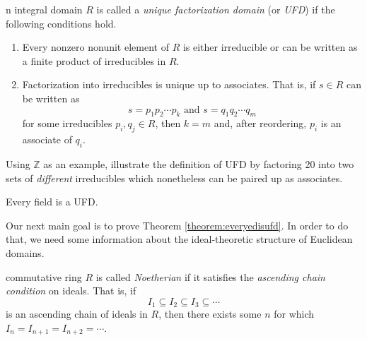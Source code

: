 \documentclass[english,course]{lecture}
\theoremstyle{plain}
\newenvironment{definition}[1]
  {\renewcommand\theinnerdefinition{#1}\innerdefinition}
  {\endinnerdefinition}
\def\Z{{\mathbb Z}}
\def\presnotes{}
\begin{document}
\begin{definition}
	An integral domain $R$ is called a \emph{unique factorization domain} (or \emph{UFD}) if the following conditions hold.
	\begin{enumerate}
		\item Every nonzero nonunit element of $R$ is either irreducible or can be written as a finite product of irreducibles in $R$.
		\item Factorization into irreducibles is unique up to associates. That is, if $s\in R$ can be written as 
		\[
			s = p_1 p_2 \cdots p_k \text{ and } s = q_1 q_2 \cdots q_m
		\]
		for some irreducibles $p_i, q_j\in R$, then $k=m$ and, after reordering, $p_i$ is an associate of $q_i$.
	\end{enumerate}
\end{definition}

\begin{exer}
	Using $\Z$ as an example, illustrate the definition of UFD by factoring 20 into two sets of \emph{different} irreducibles which nonetheless can be paired up as associates.
\end{exer}

\presnotes

\begin{theorem}
	Every field is a UFD.
\end{theorem}

\presnotes


\begin{comment}
The following theorem will take some work to prove.
In order to get there, you will need several results about divisibility in Euclidean domains.
However, you have already seen more concrete versions of all of them!
Your goal, then, is to state and prove several\footnote{It may depend on how you structure your theorem statements, but you probably need 5--10 theorems supporting the proof of Theorem \ref{theorem:everyedisufd}.} theorems which will allow the proof of Theorem \ref{theorem:everyedisufd} to follow the template established in $\Z$ and $F[x]$.
\end{comment}

Our next main goal is to prove Theorem \ref{theorem:everyedisufd}.
In order to do that, we need some information about the ideal-theoretic structure of Euclidean domains.



\begin{definition}
	A commutative ring $R$ is called \emph{Noetherian} if it satisfies the \emph{ascending chain condition} on ideals.
	That is, if
	\[
		I_1 \subseteq I_2\subseteq I_3\subseteq \cdots
	\]
	is an ascending chain of ideals in $R$, then there exists some $n$ for which $I_n = I_{n+1} = I_{n+2} = \cdots$.
\end{definition}
\end{document}
